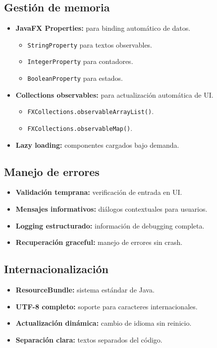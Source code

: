 \subsection{Gestión de memoria}

\begin{itemize}
    \item \textbf{JavaFX Properties:} para binding automático de datos.
    \begin{itemize}
        \item \texttt{StringProperty} para textos observables.
        \item \texttt{IntegerProperty} para contadores.
        \item \texttt{BooleanProperty} para estados.
    \end{itemize}
    \item \textbf{Collections observables:} para actualización automática de UI.
    \begin{itemize}
        \item \texttt{FXCollections.observableArrayList()}.
        \item \texttt{FXCollections.observableMap()}.
    \end{itemize}
    \item \textbf{Lazy loading:} componentes cargados bajo demanda.
\end{itemize}

\subsection{Manejo de errores}

\begin{itemize}
    \item \textbf{Validación temprana:} verificación de entrada en UI.
    \item \textbf{Mensajes informativos:} diálogos contextuales para usuarios.
    \item \textbf{Logging estructurado:} información de debugging completa.
    \item \textbf{Recuperación graceful:} manejo de errores sin crash.
\end{itemize}

\subsection{Internacionalización}

\begin{itemize}
    \item \textbf{ResourceBundle:} sistema estándar de Java.
    \item \textbf{UTF-8 completo:} soporte para caracteres internacionales.
    \item \textbf{Actualización dinámica:} cambio de idioma sin reinicio.
    \item \textbf{Separación clara:} textos separados del código.
\end{itemize}


